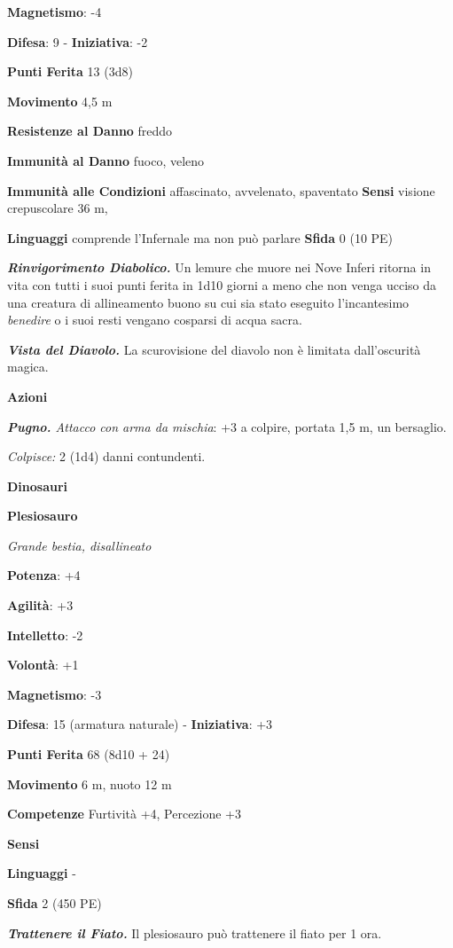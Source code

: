 \begin{multicols}{2}
\textbf{Magnetismo}: -4

\textbf{Difesa}: 9 - \textbf{Iniziativa}: -2

\textbf{Punti Ferita} 13 (3d8)

\textbf{Movimento} 4,5 m

\textbf{Resistenze al Danno} freddo

\textbf{Immunità al Danno} fuoco, veleno

\textbf{Immunità alle Condizioni} affascinato, avvelenato, spaventato
\textbf{Sensi} visione crepuscolare 36 m, 

\textbf{Linguaggi} comprende l'Infernale ma non può parlare
\textbf{Sfida} 0 (10 PE)

\emph{\textbf{Rinvigorimento Diabolico.}} Un lemure che muore nei Nove
Inferi ritorna in vita con tutti i suoi punti ferita in 1d10 giorni a
meno che non venga ucciso da una creatura di allineamento buono su cui
sia stato eseguito l'incantesimo \emph{benedire} o i suoi resti vengano
cosparsi di acqua sacra.

\emph{\textbf{Vista del Diavolo.}} La scurovisione del diavolo non è
limitata dall'oscurità magica.

\textbf{Azioni}

\emph{\textbf{Pugno.} Attacco con arma da mischia}: +3 a colpire,
portata 1,5 m, un bersaglio.

\emph{Colpisce:} 2 (1d4) danni contundenti.

\textbf{Dinosauri}

\textbf{Plesiosauro}

\emph{Grande bestia, disallineato}

\textbf{Potenza}: +4

\textbf{Agilità}: +3

\textbf{Intelletto}: -2

\textbf{Volontà}: +1

\textbf{Magnetismo}: -3

\textbf{Difesa}: 15 (armatura naturale) - \textbf{Iniziativa}: +3

\textbf{Punti Ferita} 68 (8d10 + 24)

\textbf{Movimento} 6 m, nuoto 12 m

\textbf{Competenze} Furtività +4, Percezione +3

\textbf{Sensi} 

\textbf{Linguaggi} -

\textbf{Sfida} 2 (450 PE)

\emph{\textbf{Trattenere il Fiato.}} Il plesiosauro può trattenere il
fiato per 1 ora.


\end{multicols}
